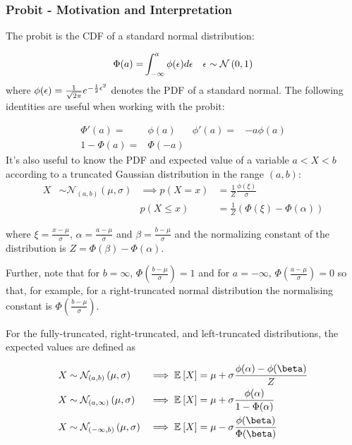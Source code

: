 \subsubsection{Probit - Motivation and Interpretation}
The probit is the CDF of a standard normal distribution:

\begin{align}
\Phi(a) = & \int_{-\infty}^{a} \phi(\epsilon) d\epsilon & \epsilon \sim \mathcal{N} \left( {0}, {1} \right)
\end{align}
where $\phi(\epsilon) = \frac{1}{\sqrt{2\pi}} e^{-\frac{1}{2} \epsilon ^2}$ denotes the PDF of a standard normal. The following identities are useful when working with the probit:

\begin{align}
    \Phi'(a) = & \phi(a)  & \phi'(a) = & -a \phi(a) \\
    1 - \Phi(a) = & \Phi(-a) & \text{ } & \text{ }
  \label{eqn:probit-identities}
\end{align}
It's also useful to know the PDF and expected value of a variable $a < X < b$ according to a truncated Gaussian distribution in the range $(a,b)$:
\begin{align}
X & \sim \mathcal{N}_{(a,b)}\left(\mu, \sigma \right) & \implies p(X = x) & = \frac{1}{Z} \frac{\phi (\xi)}{\sigma} \\
 & & p(X \leq x) & = \frac{1}{Z} \left( \Phi(\xi) - \Phi(\alpha)\right)
\end{align}

where $\xi = \frac{x - \mu}{\sigma}$, $\alpha = \frac{a - \mu}{\sigma}$ and $\beta = \frac{b - \mu}{\sigma}$ and the normalizing constant of the distribution is $Z = \Phi(\beta) - \Phi(\alpha)$. 

Further, note that for $b = \infty$, $\Phi(\frac{b-\mu}{\sigma}) = 1$ and for $a = -\infty$, $\Phi(\frac{a-\mu}{\sigma}) = 0$ so that, for example, for a right-truncated normal distribution the normalising constant is $\Phi(\frac{b - \mu}{\sigma})$.

For the fully-truncated, right-truncated, and left-truncated distributions, the expected values are defined as

\begin{align}
X & \sim \mathcal{N}_{(a,b)}\left(\mu, \sigma \right) & \implies \ex{X}{} & = \mu + \sigma \frac{\phi(\alpha) - \phi(\beta)}{Z} \label{eqn:full-trunc-mean} \\ 
X & \sim \mathcal{N}_{(a,\infty)}\left(\mu, \sigma \right) & \implies \ex{X}{} & = \mu + \sigma \frac{\phi(\alpha)}{1 - \Phi(\alpha)} \label{eqn:left-trunc-mean} \\
X & \sim \mathcal{N}_{(-\infty,b)}\left(\mu, \sigma \right) & \implies \ex{X}{} & = \mu - \sigma\frac{\phi(\beta)}{\Phi(\beta)} \label{eqn:right-trunc-mean}
\end{align}



